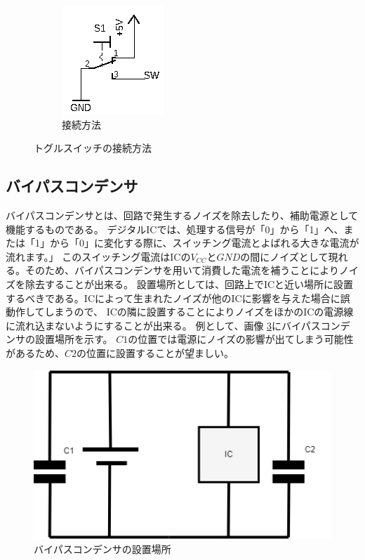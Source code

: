 \documentclass[a4paper,11pt]{ltjsarticle}
\begin{document}
\begin{figure}[htbp]
\begin{subfigure}{0.4\columnwidth}
    \includegraphics[width=0.8\columnwidth]{./image/toggle_b.png}
    \caption{接続方法}
    \label{fig:toggle_b}
  \end{subfigure}
  \caption{トグルスイッチの接続方法}
\end{figure}

\subsection{バイパスコンデンサ}
バイパスコンデンサとは、回路で発生するノイズを除去したり、補助電源として機能するものである。
デジタルICでは、処理する信号が「0」から「1」へ、または「1」から「0」に変化する際に、スイッチング電流とよばれる大きな電流が流れます。」\cite{参照ラベル名1}
このスイッチング電流はICの$V_{CC}$と$GND$の間にノイズとして現れる。そのため、バイパスコンデンサを用いて消費した電流を補うことによりノイズを除去することが出来る。
設置場所としては、回路上でICと近い場所に設置するべきである。ICによって生まれたノイズが他のICに影響を与えた場合に誤動作してしまうので、
ICの隣に設置することによりノイズをほかのICの電源線に流れ込まないようにすることが出来る。
例として、画像 \ref{fig:condenser}にバイパスコンデンサの設置場所を示す。
$C1$の位置では電源にノイズの影響が出てしまう可能性があるため、$C2$の位置に設置することが望ましい。
\begin{figure}[htbp]
  \centering
  \includegraphics[width=0.5\columnwidth]{./image/cap.drawio.png}
  \caption{バイパスコンデンサの設置場所}
  \label{fig:condenser}
\end{figure}
\newpage
\end{document}

